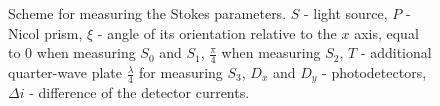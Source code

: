 \begin{figure}
\centering



\caption{Scheme for measuring the Stokes parameters. $S$ - light source, $P$
  - Nicol prism, $\xi$ - angle of its orientation relative to the $x$ axis,
  equal to 0 when measuring $S_0$ and $S_1$, $\frac{\pi}{4}$ when
  measuring $S_2$, $T$ - additional quarter-wave plate
$\frac{\lambda}{4}$ for measuring $S_3$, $D_x$ and $D_y$ -
photodetectors, $\Delta i$ - difference of the detector currents.}
\label{figPart3EntangStokes}
\end{figure}